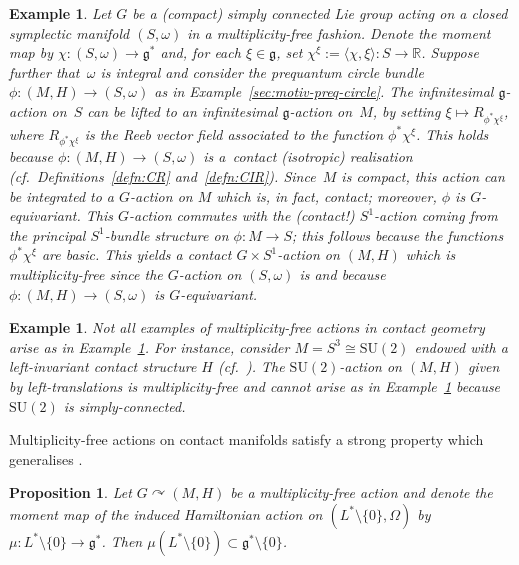 \documentclass[pdftex]{sigma}
\numberwithin{equation}{section}
\newtheorem{Proposition}[Theorem]{Proposition}
\newtheorem{Example}[Theorem]{Example}
\newcommand{\CM}{(M,H)} %
\newcommand{\SM}{(S,\omega)} %
\newcommand{\SYM}{L^* \setminus \{0\}} %
\newcommand{\RR}{\mathbb{R}}
\begin{document}
\begin{Example}\label{exm:prequant_mult_free}
Let $G$ be a (compact) simply connected Lie group acting on a closed symplectic manifold $\SM$ in a multiplicity-free fashion. Denote the moment map by $\chi \colon \SM \to \mathfrak{g}^*$ and, for each $\xi \in \mathfrak{g}$, set $\chi^{\xi}:=\langle \chi,\xi \rangle \colon S \to \RR$. Suppose further that~$\omega$ is integral and consider the prequantum circle bundle $ \phi \colon \CM \to \SM$ as in Example~\ref{sec:motiv-preq-circle}. The inf\/initesimal $\mathfrak{g}$-action on~$S$ can be lifted to an inf\/initesimal $\mathfrak{g}$-action on~$M$, by setting $\xi \mapsto R_{\phi^* \chi^{\xi}}$, where $R_{\phi^* \chi^{\xi}}$ is the Reeb vector f\/ield associated to the function $\phi^*\chi^{\xi}$. This holds because $\phi \colon \CM \to \SM$ is a~{\em contact (isotropic) realisation} (cf.\ Def\/initions~\ref{defn:CR} and~\ref{defn:CIR}). Since~$M$ is compact, this action can be integrated to a $G$-action on $M$ which is, in fact, contact; moreover, $\phi$ is $G$-equivariant. This $G$-action commutes with the (contact!) $S^1$-action coming from the principal $S^1$-bundle structure on $\phi \colon M \to S$; this follows because the functions $\phi^*\chi^{\xi}$ are basic. This yields a contact $G \times S^1$-action on $\CM$ which is multiplicity-free since the $G$-action on $\SM$ is and because $\phi \colon \CM \to \SM$ is $G$-equivariant.
\end{Example}

\begin{Example}\label{exm:S3}
Not all examples of multiplicity-free actions in contact geometry arise as in Example~\ref{exm:prequant_mult_free}. For instance, consider $M = S^3 \cong \mathrm{SU}(2)$ endowed with a left-invariant contact structure $H$ (cf.~\cite{boothby_wang}). The $\mathrm{SU}(2)$-action on $\CM$ given by left-translations is multiplicity-free and cannot arise as in Example~\ref{exm:prequant_mult_free} because $\mathrm{SU}(2)$ is simply-connected.
\end{Example}

Multiplicity-free actions on contact manifolds satisfy a strong property which generalises \cite[Lemma~2.12]{lerman_contact_toric}.

\begin{Proposition}\label{lemma:mu_misses_zero}
Let $G \curvearrowright \CM$ be a multiplicity-free action and denote the moment map of the induced Hamiltonian action on $(\SYM,\Omega)$ by $\mu \colon \SYM \to \mathfrak{g}^*$. Then $\mu ( \SYM ) \subset \mathfrak{g}^* \setminus \{0\}$.
\end{Proposition}
\end{document}
